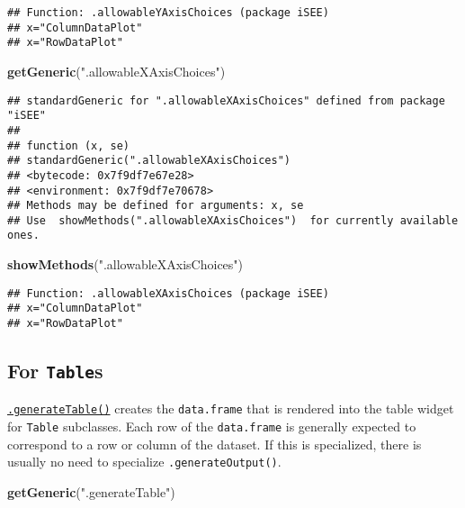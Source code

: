 \documentclass[
]{book}
\newenvironment{Shaded}{\begin{snugshade}}{\end{snugshade}}
\newcommand{\KeywordTok}[1]{\textcolor[rgb]{0.13,0.29,0.53}{\textbf{#1}}}
\newcommand{\NormalTok}[1]{#1}
\newcommand{\StringTok}[1]{\textcolor[rgb]{0.31,0.60,0.02}{#1}}
\begin{document}
\begin{verbatim}
## Function: .allowableYAxisChoices (package iSEE)
## x="ColumnDataPlot"
## x="RowDataPlot"
\end{verbatim}

\begin{Shaded}
\begin{Highlighting}[]
\KeywordTok{getGeneric}\NormalTok{(}\StringTok{".allowableXAxisChoices"}\NormalTok{)}
\end{Highlighting}
\end{Shaded}

\begin{verbatim}
## standardGeneric for ".allowableXAxisChoices" defined from package "iSEE"
## 
## function (x, se) 
## standardGeneric(".allowableXAxisChoices")
## <bytecode: 0x7f9df7e67e28>
## <environment: 0x7f9df7e70678>
## Methods may be defined for arguments: x, se
## Use  showMethods(".allowableXAxisChoices")  for currently available ones.
\end{verbatim}

\begin{Shaded}
\begin{Highlighting}[]
\KeywordTok{showMethods}\NormalTok{(}\StringTok{".allowableXAxisChoices"}\NormalTok{)}
\end{Highlighting}
\end{Shaded}

\begin{verbatim}
## Function: .allowableXAxisChoices (package iSEE)
## x="ColumnDataPlot"
## x="RowDataPlot"
\end{verbatim}

\hypertarget{for-tables}{%
\subsection{\texorpdfstring{For \texttt{Table}s}{For Tables}}\label{for-tables}}

\href{https://isee.github.io/iSEE/reference/table-generics.html}{\texttt{.generateTable()}} creates the \texttt{data.frame} that is rendered into the table widget for \texttt{Table} subclasses.
Each row of the \texttt{data.frame} is generally expected to correspond to a row or column of the dataset.
If this is specialized, there is usually no need to specialize \texttt{.generateOutput()}.

\begin{Shaded}
\begin{Highlighting}[]
\KeywordTok{getGeneric}\NormalTok{(}\StringTok{".generateTable"}\NormalTok{)}
\end{Highlighting}
\end{Shaded}
\end{document}
